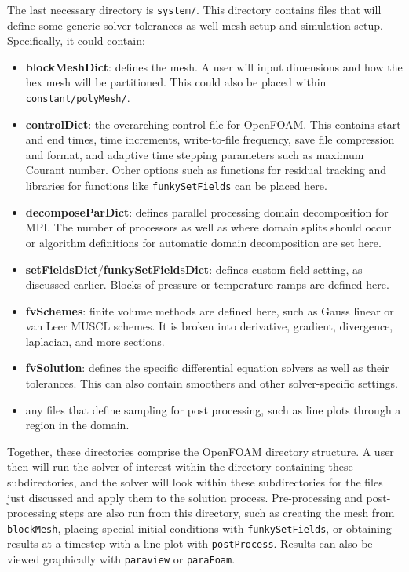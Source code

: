 The last necessary directory is \verb|system/|. This directory contains files that will define some generic solver tolerances as well mesh setup and simulation setup. Specifically, it could contain:

\begin{itemize}
    \item \textbf{blockMeshDict}: defines the mesh. A user will input dimensions and how the hex mesh will be partitioned. This could also be placed within \verb|constant/polyMesh/|. 
    \item \textbf{controlDict}: the overarching control file for OpenFOAM. This contains start and end times, time increments, write-to-file frequency, save file compression and format, and adaptive time stepping parameters such as maximum Courant number. Other options such as functions for residual tracking and libraries for functions like \verb|funkySetFields| can be placed here. 
    \item \textbf{decomposeParDict}: defines parallel processing domain decomposition for MPI. The number of processors as well as where domain splits should occur or algorithm definitions for automatic domain decomposition are set here. 
    \item \textbf{setFieldsDict}/\textbf{funkySetFieldsDict}: defines custom field setting, as discussed earlier. Blocks of pressure or temperature ramps are defined here. 
    \item \textbf{fvSchemes}: finite volume methods are defined here, such as Gauss linear or van Leer MUSCL schemes. It is broken into derivative, gradient, divergence, laplacian, and more sections. 
    \item \textbf{fvSolution}: defines the specific differential equation solvers as well as their tolerances. This can also contain smoothers and other solver-specific settings. 
    \item any files that define sampling for post processing, such as line plots through a region in the domain.  
\end{itemize}

Together, these directories comprise the OpenFOAM directory structure. A user then will run the solver of interest within the directory containing these subdirectories, and the solver will look within these subdirectories for the files just discussed and apply them to the solution process. Pre-processing and post-processing steps are also run from this directory, such as creating the mesh from \verb|blockMesh|, placing special initial conditions with \verb|funkySetFields|, or obtaining results at a timestep with a line plot with \verb|postProcess|. Results can also be viewed graphically with \verb|paraview| or \verb|paraFoam|. 


